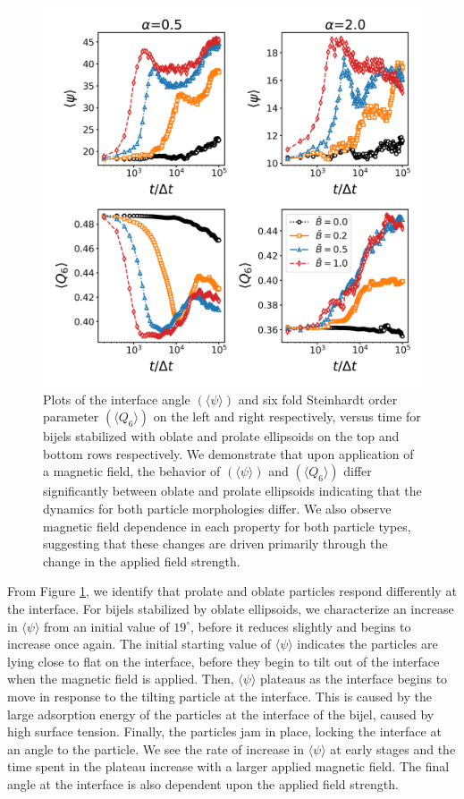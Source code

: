 \begin{figure} 
\centering 
\includegraphics[scale=0.5]{../figures/results/paper2/interface_angle-nint-field_on.png} 
\caption{Plots of the interface angle $(\langle \psi \rangle)$ and six fold Steinhardt order parameter $(\langle Q_6 \rangle)$ on the left and right respectively, versus time for bijels stabilized with oblate and prolate ellipsoids on the top and bottom rows respectively. We demonstrate that upon application of a magnetic field, the behavior of $(\langle \psi \rangle)$ and $(\langle Q_6 \rangle)$ differ significantly between oblate and prolate ellipsoids indicating that the dynamics for both particle morphologies differ. We also observe magnetic field dependence in each property for both particle types, suggesting that these changes are driven primarily through the change in the applied field strength.} 
\label{fig:interface_angle-nint-field_on} 
\end{figure}

From Figure \ref{fig:interface_angle-nint-field_on}, we identify that
prolate and oblate particles respond differently at the interface. For
bijels stabilized by oblate ellipsoids, we characterize an increase in
\(\langle \psi \rangle\) from an initial value of \(19 ^{\circ}\),
before it reduces slightly and begins to increase once again. The
initial starting value of \(\langle \psi \rangle\) indicates the
particles are lying close to flat on the interface, before they begin to
tilt out of the interface when the magnetic field is applied. Then,
\(\langle \psi \rangle\) plateaus as the interface begins to move in
response to the tilting particle at the interface. This is caused by the
large adsorption energy of the particles at the interface of the bijel,
caused by high surface tension. Finally, the particles jam in place,
locking the interface at an angle to the particle. We see the rate of
increase in \(\langle \psi \rangle\) at early stages and the time spent
in the plateau increase with a larger applied magnetic field. The final
angle at the interface is also dependent upon the applied field
strength.

